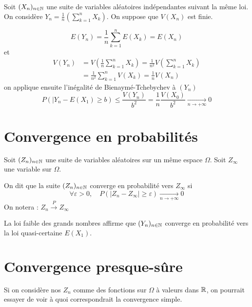 
Soit $(X_n)_{n \in \mathbb{N}}$ une suite de variables aléatoires indépendantes suivant la même loi.
On considère $Y_n = \frac{1}{n} (\sum_{k=1}^{n} X_k)$. On suppose que $V(X_n)$ est finie.

    \[ E(Y_n) = \frac{1}{n} \sum_{k=1}^{n} E(X_k) = E(X_n) \] 
et 
    \[ 
        \begin{aligned}
            V(Y_n) &= V \left( \frac{1}{n} \sum_{k=1}^{n} X_k \right)  = \frac{1}{n^2} V \left( \sum_{k=1}^{n} X_k \right)  \\
            &= \frac{1}{n^2} \sum_{k=1}^{n} V(X_k) = \frac{1}{n} V(X_n)
        \end{aligned}
     \] 
on applique ensuite l'inégalité de Bienaymé-Tchebychev à $(Y_n)$
        \[ \boxed{ P(|Y_n - E(X_1) \geq b) \leq \frac{V(Y_n)}{b^2} = \frac{1}{n} \frac{V(X_0)}{b^2} \underset{n \to + \infty}{\longrightarrow} 0 } \] 



\section*{Convergence en probabilités}

Soit $(Z_n)_{n \in \mathbb{N}}$ une suite de variables aléatoires sur un même espace $\Omega$. Soit $Z_\infty$ une variable sur $\Omega$. 

\begin{definition}
    On dit que la suite $(Z_n)_{n \in \mathbb{N}}$ converge en probabilité vers $Z_\infty$ si 
        \[ \forall \varepsilon > 0, \quad \boxed{ P(|Z_n - Z_\infty| \geq \varepsilon) \underset{n \to + \infty}{\longrightarrow} 0} \]
    On notera : $ Z_n \stackrel{P}{\longrightarrow} Z_\infty $
\end{definition}

\begin{remark}
    La loi faible des grands nombres affirme que $(Y_n)_{n \in \mathbb{N}}$ converge en probabilité vers la loi quasi-certaine $E(X_1)$.
\end{remark}


\section*{Convergence presque-sûre}

Si on considère nos $Z_n$ comme des fonctions sur $\Omega$ à valeurs dans $\mathbb{R}$, on pourrait essayer de voir à quoi correspondrait la convergence simple.

